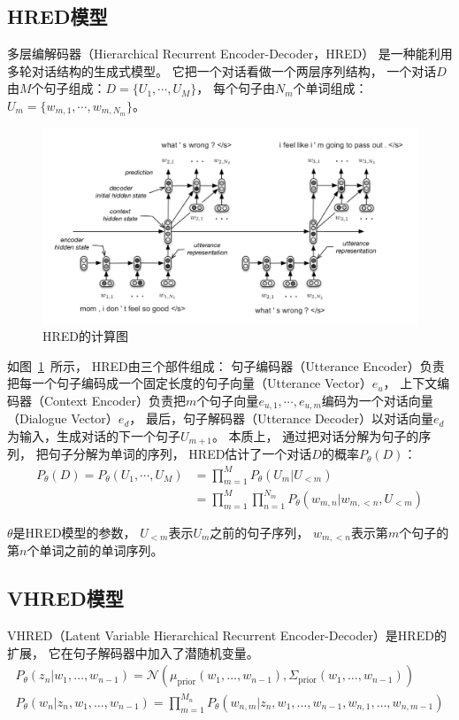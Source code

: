 \subsection{HRED模型}\label{subsec:HRED}
多层编解码器（Hierarchical Recurrent Encoder-Decoder，HRED）
是一种能利用多轮对话结构的生成式模型。
它把一个对话看做一个两层序列结构，
一个对话$D$由$M$个句子组成：$D = \{ U_1, \cdots, U_M \}$，
每个句子由$N_m$个单词组成：$U_m = \{ w_{m, 1}, \cdots, w_{m, N_m} \}$。
\begin{figure}[H]
    \centering
    \includegraphics[width=\textwidth]{figure/HRED.png}
    \caption{HRED的计算图}
    \label{fig:HRED_computation_graph}
\end{figure}

如图~\ref{fig:HRED_computation_graph}~所示，
HRED由三个部件组成：
句子编码器（Utterance Encoder）负责把每一个句子编码成一个固定长度的句子向量（Utterance Vector）$e_u$，
上下文编码器（Context Encoder）负责把$m$个句子向量$e_{u,1}, \cdots, e_{u,m}$编码为一个对话向量（Dialogue Vector）$e_d$，
最后，句子解码器（Utterance Decoder）以对话向量$e_d$为输入，生成对话的下一个句子$U_{m+1}$。
本质上， 通过把对话分解为句子的序列， 把句子分解为单词的序列，
HRED估计了一个对话$D$的概率$P_{\theta}(D)$：
\begin{align}
    P_{\theta}(D) = P_{\theta}(U_1, \cdots, U_M) &= \prod_{m=1}^M P_{\theta}(U_m|U_{<m}) \\
    &= \prod_{m=1}^M \prod_{n=1}^{N_m} P_{\theta}( w_{m, n} |w_{m, <n}, U_{<m} )
\end{align}

$\theta$是HRED模型的参数，
$U_{<m}$表示$U_m$之前的句子序列，
$w_{m, <n}$表示第$m$个句子的第$n$个单词之前的单词序列。


\subsection{VHRED模型}\label{subsec:VHRED}
VHRED（Latent Variable Hierarchical Recurrent Encoder-Decoder）是HRED的扩展，
它在句子解码器中加入了潜随机变量。
\begin{align}
    P_{\theta}(z_n|w_1, \dots, w_{n-1}) = \mathcal{N}(\mu_{\text{prior}}(w_1, \dots, w_{n-1}), \Sigma_{\text{prior}}(w_1, \dots, w_{n-1})) \\
    P_{\theta}(w_n|z_n, w_1, \dots, w_{n-1}) = \prod_{m=1}^{M_n}P_{\theta}(w_{n, m}|z_n, w_1, \dots, w_{n-1}, w_{n, 1}, \dots, w_{n, m-1})
\end{align}

